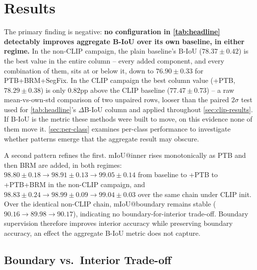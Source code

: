 \documentclass{article}
\theoremstyle{plain}
\theoremstyle{definition}
\theoremstyle{remark}
\begin{document}
\section{Results}
\label{sec:results}

\begin{table}[t]
\centering
\resizebox{\textwidth}{!}{}
\caption{Mean $\pm$ std across 3 seeds, all 10 ablations, under both a random and
a CLIP-initialized codebook. Best value per column is bolded within each
campaign block. $\Delta$ B-IoU is the paired (same seed, same architecture)
delta of each CLIP-campaign row vs.\ its non-CLIP counterpart.}
\label{tab:headline}
\end{table}

The primary finding is negative:
\textbf{no configuration in \cref{tab:headline} detectably improves aggregate
B-IoU over its own baseline, in either regime.} In the non-CLIP campaign, the
plain baseline's B-IoU ($78.37\pm0.42$) is the best value in the entire
column -- every added component, and every combination of them, sits at or
below it, down to $76.90\pm0.33$ for PTB+BRM+SegFix. In the CLIP campaign the
best column value (+PTB, $78.29\pm0.38$) is only $0.82$pp above the CLIP
baseline ($77.47\pm0.73$) -- a raw mean-vs-own-std comparison of two unpaired
rows, looser than the paired $2\sigma$ test used for \cref{tab:headline}'s
$\Delta$B-IoU column and applied throughout \cref{sec:clip-results}.
If B-IoU is the metric these methods were built to move, on this evidence
none of them move it. \cref{sec:per-class} examines per-class performance to investigate whether patterns emerge that the aggregate result may obscure.

A second pattern refines the first. mIoU@inner rises monotonically as PTB and then BRM are added, in both regimes: $98.80\pm0.18 \to 98.91\pm0.13 \to 99.05\pm0.14$ from baseline to +PTB to +PTB+BRM in the non-CLIP campaign, and $98.83\pm0.24 \to 98.99\pm0.09 \to 99.04\pm0.03$ over the same chain under CLIP init. Over the identical non-CLIP chain, mIoU@boundary remains stable ($90.16 \to 89.98 \to 90.17$), indicating no boundary-for-interior trade-off. Boundary supervision therefore improves interior accuracy while preserving boundary accuracy, an effect the aggregate B-IoU metric does not capture.

\subsection{Boundary vs.\ Interior Trade-off}
\label{sec:results:tradeoff}
\end{document}
